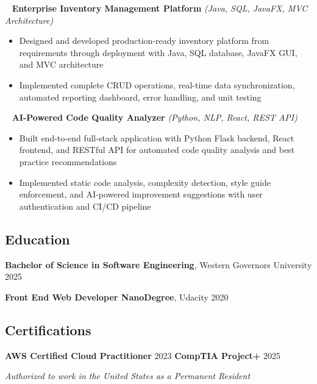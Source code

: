 \documentclass[12pt,letterpaper]{article}
\newcommand{\normalsizesection}{\normalsize}
\newcommand{\smallersection}{\small}
\newcommand{\sectionbox}[1]{%
    \vspace{0.1em}
    \begin{tcolorbox}[
        colback=sectionbg,
        colframe=sectionbg,
        width=\textwidth,
        left=5pt,
        right=5pt,
        top=2pt,
        bottom=2pt,
        boxrule=0pt,
        arc=0pt,
        boxsep=0pt,
    ]
    \section*{#1}
    \end{tcolorbox}
    \vspace{-0.4em}
}
\newcommand{\tech}[1]{\textit{(#1)}}
\newenvironment{projectentry}{%
    \leftskip=0cm
    \par\noindent
}{\par\leftskip=0cm\vspace{-2pt}}
\newenvironment{projectdesc}{%
    \footnotesize
    \begin{itemize}[leftmargin=*, topsep=0pt, itemsep=0pt, parsep=0pt]
}{\end{itemize}\smallersection\vspace{1pt}}
\newcommand{\projicon}[1]{%
    {\small\color{gray!70}#1}~%
}
\begin{document}
\begin{projectentry}
    \projicon{\faDatabase} \textbf{Enterprise Inventory Management Platform} \tech{Java, SQL, JavaFX, MVC Architecture}
\end{projectentry}
\begin{projectdesc}
    \item Designed and developed production-ready inventory platform from requirements through deployment with Java, SQL database, JavaFX GUI, and MVC architecture
    \item Implemented complete CRUD operations, real-time data synchronization, automated reporting dashboard, error handling, and unit testing
\end{projectdesc}

\begin{projectentry}
    \projicon{\faLaptopCode} \textbf{AI-Powered Code Quality Analyzer} \tech{Python, NLP, React, REST API}
\end{projectentry}
\begin{projectdesc}
    \item Built end-to-end full-stack application with Python Flask backend, React frontend, and RESTful API for automated code quality analysis and best practice recommendations
    \item Implemented static code analysis, complexity detection, style guide enforcement, and AI-powered improvement suggestions with user authentication and CI/CD pipeline
\end{projectdesc}

\normalsizesection

\sectionbox{Education}
\smallersection

\noindent\textbf{Bachelor of Science in Software Engineering}, Western Governors University \hfill 2025

\vspace{-2pt}
\noindent\textbf{Front End Web Developer NanoDegree}, Udacity \hfill 2020

\normalsizesection

\sectionbox{Certifications}
\smallersection

\noindent\textbf{AWS Certified Cloud Practitioner} \hfill 2023 \quad \textbf{CompTIA Project+} \hfill 2025

\vspace{1pt}

\normalsizesection

\vspace{2pt}
\begin{flushright}
\textit{Authorized to work in the United States as a Permanent Resident}
\end{flushright}
\end{document}
